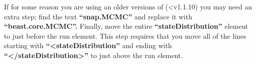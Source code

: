 {    \begin{compactdesc}
       \item[\field{chainLength: MCMC sample length for each path sampling step.}]
       \item[\field{alpha: parameter used to space out path sampling steps.}]
       \item[\field{rootdir: directory for storing output. Be sure that the folder exists before starting the run.}]
       \item[\field{burnInPercentage: burn-In percentage used for analyzing the log files.}]
       \item[\field{preBurnin: number of samples that are discarded for the first step, but not the others.}]
       \item[\field{deleteOldLogs: delete existing log files from rootdir}]
      \item[\field{nrOfSteps: the number of path sampling steps to use}]
    \end{compactdesc}
    
If for some reason you are using an older versions of  (<v1.1.10) you may need an extra step; find the text {\bf ``snap.MCMC''} and replace it with {\bf ``beast.core.MCMC''.}  
Finally, move the entire {\bf ``stateDistribution''} element to just before the run element. This step requires that you move all of the lines starting with {\bf ``<stateDistribution''} and ending with {\bf ``</stateDistribution>''} to just above the run element.


}

        

